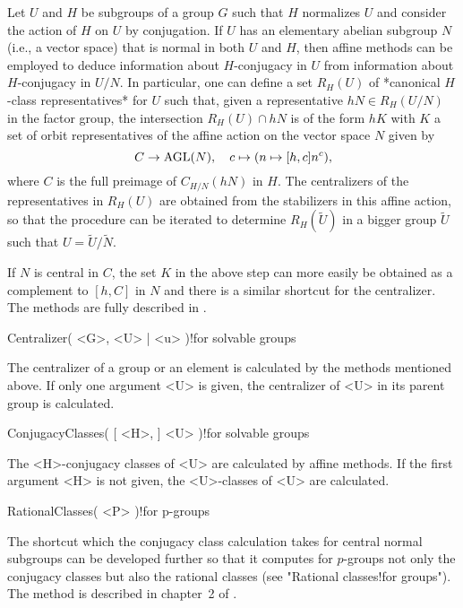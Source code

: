 
Let $U$ and $H$ be subgroups of a group  $G$ such that $H$ normalizes $U$
and   consider the action  of  $H$ on $U$ by   conjugation. If $U$ has an
elementary abelian subgroup $N$ (i.e., a  vector space) that is normal in
both $U$  and   $H$,  then affine  methods  can   be  employed  to deduce
information   about  $H$-conjugacy   in   $U$   from  information   about
$H$-conjugacy in $U/N$. In  particular, one can  define a set $R_H(U)$ of
*canonical  $H$-class  representatives*   for  $U$  such  that,  given  a
representative $hN\in R_H(U/N)$ in the   factor group, the   intersection
$R_H(U)   \cap hN$  is  of the   form $hK$    with $K$  a   set  of orbit
representatives of the affine action on the vector space $N$ given by
$$ C \to {\rm AGL}(N), \quad c \mapsto ( n \mapsto [h,c] n^c ), $$
where $C$ is the full preimage  of $C_{H/N}(hN)$ in $H$. The centralizers
of the representatives in $R_H(U)$  are obtained from the stabilizers  in
this affine action,  so that the procedure  can be  iterated to determine
$R_H(\tilde U)$ in a bigger group $\tilde U$ such that $U=\tilde U/\tilde
N$.

If $N$ is central in  $C$, the set $K$ in  the above step can more easily
be obtained as  a  complement to $[h,C]$ in  $N$  and there is a  similar
shortcut  for    the centralizer. The methods     are  fully described in
\cite{MeckyNeubuser89}.

\>Centralizer( <G>, <U> | <u> )!{for solvable groups}

The centralizer of a  group or an element   is calculated by  the methods
mentioned  above. If only one argument  <U> is given,  the centralizer of
<U> in its parent group is calculated.

\>ConjugacyClasses( [ <H>, ] <U> )!{for solvable groups}

The <H>-conjugacy classes of <U> are calculated by affine methods. If the
first argument <H> is not given, the <U>-classes of <U> are calculated.

\>RationalClasses( <P> )!{for p-groups}

The  shortcut  which the conjugacy  class  calculation  takes for central
normal  subgroups  can be  developed  further so  that   it computes  for
$p$-groups not  only the conjugacy classes but  also the rational classes
(see "Rational classes!for groups"). The method is described in chapter~2
of \cite{Theissen93}.

